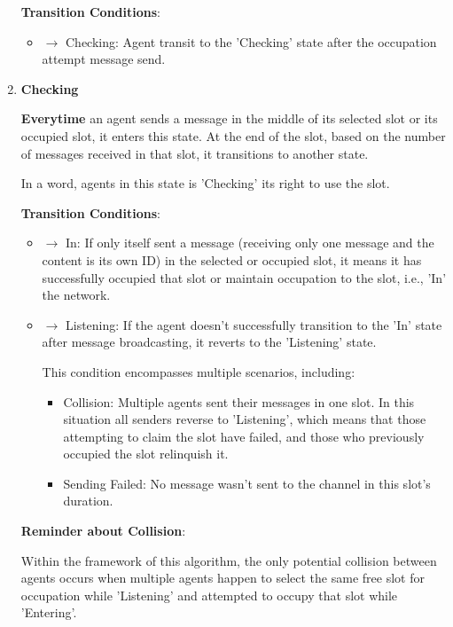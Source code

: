 \begin{enumerate}
    \textbf{Transition Conditions}:

    \begin{itemize}
        \item $\rightarrow$ Checking: Agent transit to the 'Checking' state after the occupation attempt message send.
    \end{itemize}


    \item \textbf{Checking}
    
    \textbf{Everytime} an agent sends a message in the middle of its selected slot or its occupied slot, it enters this state. At the end of the slot, based on the number of messages received in that slot, it transitions to another state.

    In a word, agents in this state is 'Checking' its right to use the slot.

    \textbf{Transition Conditions}:



    \begin{itemize}
        \item $\rightarrow$ In: If only itself sent a message (receiving only one message and the content is its own ID) in the selected or occupied slot, it means it has successfully occupied that slot or maintain occupation to the slot, i.e., 'In' the network.
        \item $\rightarrow$ Listening: If the agent doesn't successfully transition to the 'In' state after message broadcasting, it reverts to the 'Listening' state. 
        
        This condition encompasses multiple scenarios, including: 
        \begin{itemize}
            \item Collision: Multiple agents sent their messages in one slot. In this situation all senders reverse to 'Listening', which means that those attempting to claim the slot have failed, and those who previously occupied the slot relinquish it.
            \item Sending Failed: No message wasn't sent to the channel in this slot's duration.
        \end{itemize}
    \end{itemize}

    \textbf{Reminder about Collision}:

    Within the framework of this algorithm, the only potential collision between agents occurs when multiple agents happen to select the same free slot for occupation while 'Listening' and attempted to occupy that slot while 'Entering'.  


\end{enumerate}
